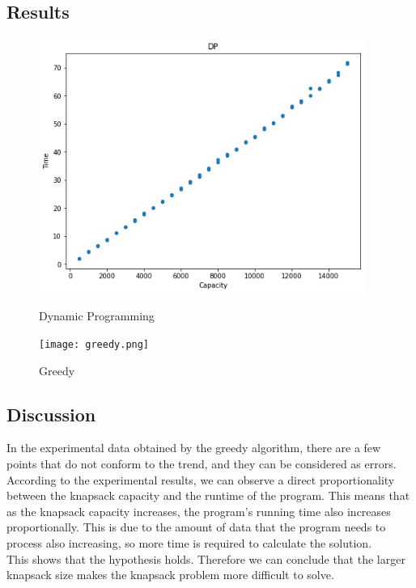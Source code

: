 \documentclass[a4]{article}
\begin{document}
\subsection{Results}
\begin{figure}[H]
    \begin{minipage}{0.48\textwidth}
    \includegraphics[width=0.95\textwidth]{dp.png}
    \caption{Dynamic Programming}
    \end{minipage}
    \begin{minipage}{0.48\textwidth}
    \texttt{[image: greedy.png]}
    \caption{Greedy}
    \end{minipage}
\end{figure}


\subsection{Discussion}

In the experimental data obtained by the greedy algorithm, there are a few points that do not conform to the trend, and they can be considered as errors. According to the experimental results, we can observe a direct proportionality between the knapsack capacity and the runtime of the program. This means that as the knapsack capacity increases, the program's running time also increases proportionally. This is due to the amount of data that the program needs to process also increasing, so more time is required to calculate the solution.\\

\noindent This shows that the hypothesis holds. Therefore we can conclude that the larger knapsack size makes the knapsack problem more difficult to solve.\\
\end{document}
